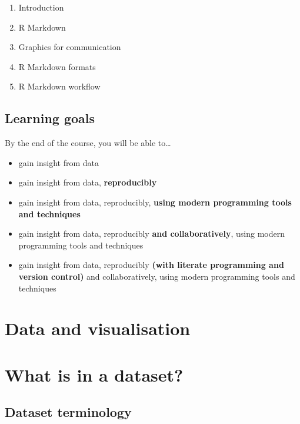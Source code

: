 \documentclass[
]{book}
\providecommand{\tightlist}{%
  \setlength{\itemsep}{0pt}\setlength{\parskip}{0pt}}
\theoremstyle{definition}
\theoremstyle{definition}
\theoremstyle{definition}
\theoremstyle{definition}
\theoremstyle{remark}
\begin{document}
\begin{enumerate}
\def\labelenumi{\arabic{enumi})}
\setcounter{enumi}{25}
\tightlist
\item
  Introduction
\item
  R Markdown
\item
  Graphics for communication
\item
  R Markdown formats
\item
  R Markdown workflow
\end{enumerate}

\hypertarget{learning-goals-1}{%
\section{Learning goals}\label{learning-goals-1}}

By the end of the course, you will be able to\ldots{}

\begin{itemize}
\tightlist
\item
  gain insight from data
\item
  gain insight from data, \textbf{reproducibly}
\item
  gain insight from data, reproducibly, \textbf{using modern programming tools and techniques}
\item
  gain insight from data, reproducibly \textbf{and collaboratively}, using modern programming tools and techniques
\item
  gain insight from data, reproducibly \textbf{(with literate programming and version control)} and collaboratively, using modern programming tools and techniques
\end{itemize}

\hypertarget{data-and-visualisation}{%
\chapter{Data and visualisation}\label{data-and-visualisation}}

\hypertarget{what-is-in-a-dataset}{%
\chapter{What is in a dataset?}\label{what-is-in-a-dataset}}

\hypertarget{dataset-terminology}{%
\section{Dataset terminology}\label{dataset-terminology}}
\end{document}

